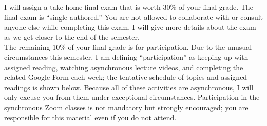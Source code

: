 \documentclass[11pt,letterpaper]{article}
\begin{document}
\noindent I will assign a take-home final exam that is worth 30\%  of your final grade. The final exam is ``single-authored.'' You are not allowed to collaborate with or consult anyone else while completing this exam. I will give more details about the exam as we get closer to the end of the semester. \\

\noindent The remaining 10\% of your final grade is for participation. Due to the unusual circumstances this semester, I am defining ``participation'' as keeping up with assigned reading, watching asynchronous lecture videos, and completing the related Google Form each week; the tentative schedule of topics and assigned readings is shown below. Because all of these activities are asynchronous, I will only excuse you from them under exceptional circumstances. Participation in the synchronous Zoom classes is not mandatory but strongly encouraged; you are responsible for this material even if you do not attend.
\end{document}
